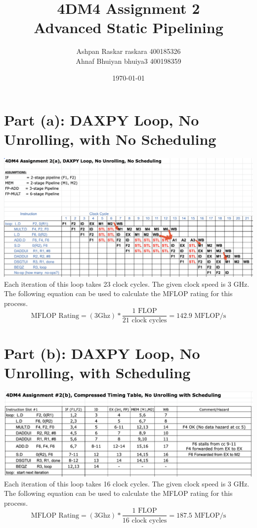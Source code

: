 \documentclass[12pt, letterpaper, titlepage, hidelinks]{article}
\title{4DM4 Assignment 2 \\ Advanced Static Pipelining}
\author{Ashpan Raskar raskara 400185326\\
		Ahnaf Bhuiyan bhuiya3 400198359}
\date{\today}
\begin{document}
\maketitle
\tableofcontents
\newpage
\setlength{\parindent}{0pt}
\setcounter{secnumdepth}{0}
\section{Part (a): DAXPY Loop, No Unrolling, with No Scheduling}
	\includegraphics[width=\textwidth]{2a-new}
	Each iteration of this loop takes 23 clock cycles. The given clock speed is 3 GHz. The following equation can be used to calculate the MFLOP rating for this process.
	\begin{equation}
		\text{MFLOP Rating} = (3 \text{{Ghz}}) * \frac{1 \text{ FLOP}}{21 \text{ clock cycles}} = 142.9 \text{ MFLOP/s}
	\end{equation}
\section{Part (b): DAXPY Loop, No Unrolling, with Scheduling}
	\includegraphics[width=\textwidth]{2b}
	Each iteration of this loop takes 16 clock cycles. The given clock speed is 3 GHz. The following equation can be used to calculate the MFLOP rating for this process.
	\begin{equation}
		\text{MFLOP Rating} = (3 \text{{Ghz}}) * \frac{1 \text{ FLOP}}{16 \text{ clock cycles}} = 187.5 \text{ MFLOP/s}
	\end{equation}
\end{document}
